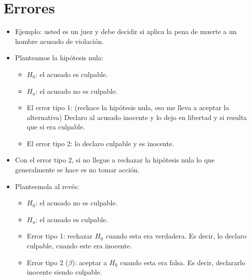 \section{Errores}
\begin{itemize}
    \item Ejemplo: usted es un juez y debe decidir si aplica la pena de muerte a un hombre acusado de violación. 
    \item Planteamos la hipótesis nula: 
        \begin{itemize}
            \item $H_0$: el acusado es culpable. 
            \item $H_a$: el acusado no es culpable. 
            \item El error tipo 1: (rechace la hipótesis nula, eso me lleva a aceptar la alternativa) Declaro al acusado inocente y lo dejo en libertad y si resulta que si era culpable. 
            \item El error tipo 2: lo declaro culpable y es inocente. 
        \end{itemize}
    
    \item Con el error tipo 2, si no llegue a rechazar la hipótesis nula lo que generalmente se hace es no tomar acción. 
    \item Planteemola al revés: 
        \begin{itemize}
            \item $H_0$: el acusado no es culpable.
            \item $H_a$: el acusado es culpable. 
            \item Error tipo 1: rechazar $H_0$ cuando esta era verdadera. Es decir, lo declaro culpable, cuando este era inocente. 
            \item Error tipo 2 ($\beta$): aceptar a $H_0$ cuando esta era falsa. Es decir, declararlo inocente siendo culpable. 
        \end{itemize}
\end{itemize}

